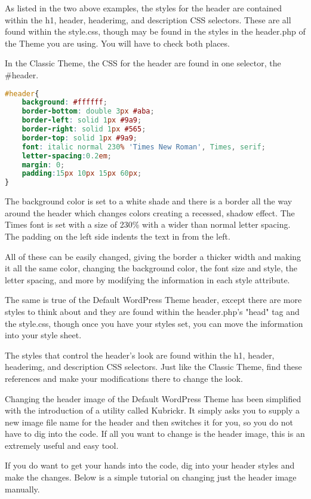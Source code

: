 As listed in the two above examples, the styles for the header are contained within the h1, header, headerimg, and description CSS selectors. These are all found within the style.css, though may be found in the styles in the header.php of the Theme you are using. You will have to check both places.

In the Classic Theme, the CSS for the header are found in one selector, the \#header.

\begin{lstlisting}[language=CSS]
#header{
    background: #ffffff;
    border-bottom: double 3px #aba;
    border-left: solid 1px #9a9;
    border-right: solid 1px #565;
    border-top: solid 1px #9a9;
    font: italic normal 230% 'Times New Roman', Times, serif;
    letter-spacing:0.2em;
    margin: 0;
    padding:15px 10px 15px 60px;
}
\end{lstlisting}

The background color is set to a white shade and there is a border all the way around the header which changes colors creating a recessed, shadow effect. The Times font is set with a size of 230\% with a wider than normal letter spacing. The padding on the left side indents the text in from the left.

All of these can be easily changed, giving the border a thicker width and making it all the same color, changing the background color, the font size and style, the letter spacing, and more by modifying the information in each style attribute.

The same is true of the Default WordPress Theme header, except there are more styles to think about and they are found within the header.php's "head" tag and the style.css, though once you have your styles set, you can move the information into your style sheet.

The styles that control the header's look are found within the h1, header, headerimg, and description CSS selectors. Just like the Classic Theme, find these references and make your modifications there to change the look.

Changing the header image of the Default WordPress Theme has been simplified with the introduction of a utility called Kubrickr. It simply asks you to supply a new image file name for the header and then switches it for you, so you do not have to dig into the code. If all you want to change is the header image, this is an extremely useful and easy tool.

If you do want to get your hands into the code, dig into your header styles and make the changes. Below is a simple tutorial on changing just the header image manually.

